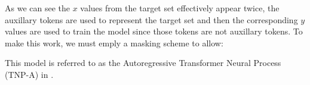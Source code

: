 \documentclass[main.tex]{subfiles}
\begin{document}
As we can see the $x$ values from the target set effectively appear twice, the auxillary tokens are used to represent the target set and then the corresponding $y$ values are used to train the model since those tokens are not auxillary tokens. To make this work, we must emply a masking scheme to allow:


This model is referred to as the Autoregressive Transformer Neural Process (TNP-A) in \cite{nguyen2023transformer}.

\ifSubfilesClassLoaded{%
    \printbibliography{}
}{} 
\end{document}
